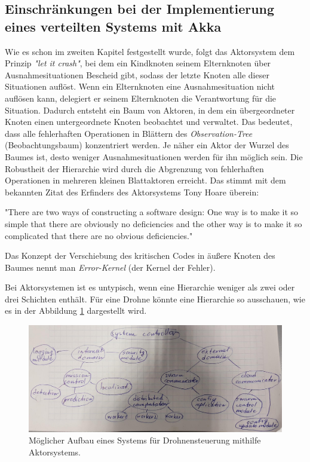 \subsection{Einschränkungen bei der Implementierung eines verteilten Systems mit Akka}

Wie es schon im zweiten Kapitel festgestellt wurde, folgt das Aktorsystem dem Prinzip \textit{"let it crash"}, bei dem ein Kindknoten seinem Elternknoten über Ausnahmesituationen Bescheid gibt, sodass der letzte Knoten alle dieser Situationen auflöst. Wenn ein Elternknoten eine Ausnahmesituation nicht auflösen kann, delegiert er seinem Elternknoten die Verantwortung für die Situation. Dadurch entsteht ein Baum von Aktoren, in dem ein übergeordneter Knoten einen untergeordnete Knoten beobachtet und verwaltet. Das bedeutet, dass alle fehlerhaften Operationen in Blättern des \textit{Observation-Tree} (Beobachtungsbaum) konzentriert werden. Je näher ein Aktor der Wurzel des Baumes ist, desto weniger Ausnahmesituationen werden für ihn möglich sein. Die Robustheit der Hierarchie wird durch die Abgrenzung von fehlerhaften Operationen in mehreren kleinen Blattaktoren erreicht. Das stimmt mit dem bekannten Zitat des Erfinders des Aktorsystems Tony Hoare überein:

"There are two ways of constructing a software design: One way is to make it so simple that there are obviously no deficiencies and the other way is to make it so complicated that there are no obvious deficiencies."

Das Konzept der Verschiebung des kritischen Codes in äußere Knoten des Baumes nennt man \textit{Error-Kernel} (der Kernel der Fehler).

Bei Aktorsystemen ist es untypisch, wenn eine Hierarchie weniger als zwei oder drei Schichten enthält. Für eine Drohne könnte eine Hierarchie so ausschauen, wie es in der Abbildung \ref{fig:hierarchy1} dargestellt wird.

\begin{figure}
	\centering
	\includegraphics[width=0.7\linewidth]{images/5_hierarchy_1}
	\caption{Möglicher Aufbau eines Systems für Drohnensteuerung mithilfe Aktorsystems.}
	\label{fig:hierarchy1}
\end{figure}

